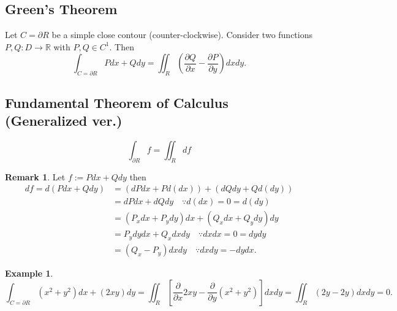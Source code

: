 \documentclass[12pt,openany]{book}
\theoremstyle{definition}
\newtheorem{remark}{Remark}[section]
\newtheorem{example}{Example}[section]
\newcommand{\R}{\mathbb{R}}
\newcommand{\of}[1]{\left( #1 \right)}
\begin{document}
	\subsection{Green's Theorem}
	Let $C=\partial R$ be a simple close contour (counter-clockwise). Consider two functions $P,Q:D\to\R$ with $P,Q\in C^1$. Then \[
	\int_{C=\partial R} Pdx+Qdy=\iint_R\of{\frac{\partial Q}{\partial x}-\frac{\partial P}{\partial y}}dxdy.
	\]
	\vspace{8pt}
	\subsection{Fundamental Theorem of Calculus (Generalized ver.)}
	\[
	\boxed{\int_{\partial R}f=\iint_R df}
	\]
	\vspace{4pt}
	\begin{remark}
		Let $f:=Pdx+Qdy$ then \begin{align*}
			df=d\of{Pdx+Qdy}&=(dPdx+Pd(dx))+(dQdy+Qd(dy))\\
			&=dPdx+dQdy\quad\because d(dx)=0=d(dy)\\
			&=\of{P_xdx+P_ydy}dx+\of{Q_xdx+Q_ydy}dy\\
			&=P_ydydx+Q_xdxdy\quad\because dxdx=0=dydy\\
			&=\of{Q_x-P_y}dxdy\quad\because dxdy=-dydx.
		\end{align*}
	\end{remark}
	\vspace{4pt}
	\begin{example}
		\[
		\int_{C=\partial R}\of{x^2+y^2}dx+\of{2xy}dy=\iint_R\left[\frac{\partial}{\partial x}2xy-\frac{\partial}{\partial y}\of{x^2+y^2}\right]dxdy=\iint_R\of{2y-2y}dxdy=0.
		\]
	\end{example}
	
\end{document}
